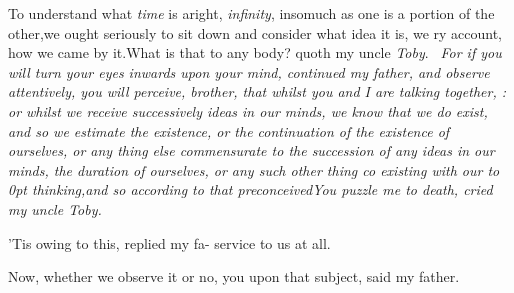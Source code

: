 \documentclass{article}
\begin{document}
To understand what \textit{time} is aright,\break
{}\break
\textit{infinity}, insomuch as one is a
portion of the other,\tsk we ought seriously to sit down and
consider what idea it is, we\break
{}\break
ry account, how we came by it.\tsk What is that
to any body? quoth my uncle \textit{Toby}.\break
\bgroup\itshape
\fnast\ For if you will turn your eyes inwards\break
upon your mind, {\upshape continued my father}, and\break
observe attentively, you will perceive, bro\-ther, 
that whilst you and I are talking together,
:\break
or whilst we receive successively ideas in our
minds, we know that we do exist, and so we
estimate the existence, or the continuation of
the existence of ourselves, or any thing else
commensurate to the succession of any ideas 
in our minds, the duration of ourselves, or 
any such other thing co existing with
our\egroup\break
\vbox to 0pt{\vskip-8pt
\vss}
\clearpage
\noindent
\textit{thinking,\tsh and so
according to that\break
preconceived}\tsh You puzzle me to death,
cried my uncle \textit{Toby}.\tsk


\tsk ’Tis owing to this, replied my fa-\break 
{} 
service to us at all.

Now, whether we observe it or no, 
you upon that subject, said my father.
\end{document}
